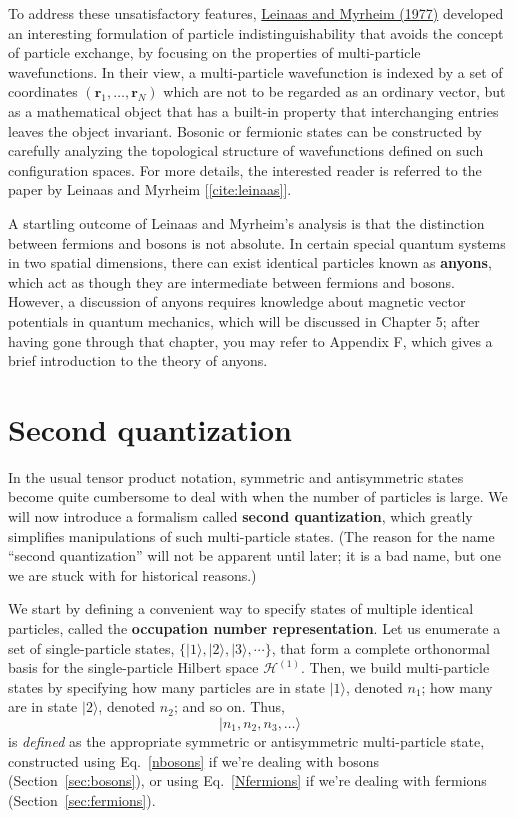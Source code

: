 \documentclass[pra,12pt]{revtex4}
\begin{document}
To address these unsatisfactory features,
\hyperref[cite:leinaas]{Leinaas and Myrheim (1977)} developed an
interesting formulation of particle indistinguishability that avoids
the concept of particle exchange, by focusing on the properties of
multi-particle wavefunctions.  In their view, a multi-particle
wavefunction is indexed by a set of coordinates $(\mathbf{r}_1, \dots,
\mathbf{r}_N)$ which are not to be regarded as an ordinary vector, but
as a mathematical object that has a built-in property that
interchanging entries leaves the object invariant.  Bosonic or
fermionic states can be constructed by carefully analyzing the
topological structure of wavefunctions defined on such configuration
spaces.  For more details, the interested reader is referred to the
paper by Leinaas and Myrheim [\ref{cite:leinaas}].

A startling outcome of Leinaas and Myrheim's analysis is that the
distinction between fermions and bosons is not absolute.  In certain
special quantum systems in two spatial dimensions, there can exist
identical particles known as \textbf{anyons}, which act as though they
are intermediate between fermions and bosons.  However, a discussion
of anyons requires knowledge about magnetic vector potentials in
quantum mechanics, which will be discussed in Chapter 5; after having
gone through that chapter, you may refer to Appendix F, which gives a
brief introduction to the theory of anyons.


\section{Second quantization}

In the usual tensor product notation, symmetric and antisymmetric
states become quite cumbersome to deal with when the number of
particles is large.  We will now introduce a formalism called
\textbf{second quantization}, which greatly simplifies manipulations
of such multi-particle states.  (The reason for the name ``second
quantization'' will not be apparent until later; it is a bad name, but
one we are stuck with for historical reasons.)

We start by defining a convenient way to specify states of multiple
identical particles, called the \textbf{occupation number
  representation}.  Let us enumerate a set of single-particle states,
$\{|1\rangle, |2\rangle, |3\rangle, \cdots\}$, that form a complete
orthonormal basis for the single-particle Hilbert space
$\mathscr{H}^{(1)}$.  Then, we build multi-particle states by
specifying how many particles are in state $|1\rangle$, denoted $n_1$;
how many are in state $|2\rangle$, denoted $n_2$; and so on.  Thus,
\begin{equation*}
  |n_1,n_2,n_3,\dots\rangle
\end{equation*}
is \textit{defined} as the appropriate symmetric or antisymmetric
multi-particle state, constructed using Eq.~\eqref{nbosons} if we're
dealing with bosons (Section~\ref{sec:bosons}), or using
Eq.~\eqref{Nfermions} if we're dealing with fermions
(Section~\ref{sec:fermions}).
\end{document}
